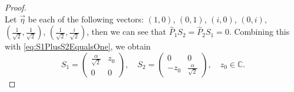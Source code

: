\documentclass[12pt]{article}
\theoremstyle{plain}
\theoremstyle{definition}
\theoremstyle{remark}
\numberwithin{equation}{section}
\begin{document}
\begin{proof}
\begin{equation}
\end{equation}
Let  $\vec{\eta}$ be each of the following vectors:
$(1,0)$, $(0,1)$,
$(i,0)$, $(0,i)$,
$(\frac{1}{\sqrt{2}},\frac{1}{\sqrt{2}})$, 
$(\frac{1}{\sqrt{2}},\frac{i}{\sqrt{2}})$,
then we can see that $\hat{P}_{1} S_{2} = \hat{P}_{2} S_{1} = 0$.
Combining this with  \eqref{eq:S1PlusS2EqualsOne}, 
we obtain
\begin{equation}
S_{1} = \begin{pmatrix}
    \frac{\alpha}{\sqrt{2}} & z_{0} \\ 0 & 0 
\end{pmatrix}, \quad
S_{2} = \begin{pmatrix}
     0 & 0 \\ - z_{0} & \frac{\alpha}{\sqrt{2}} 
\end{pmatrix}, \quad
z_{0} \in \mathbb{C}.
\end{equation}


\end{proof}
\end{document}
